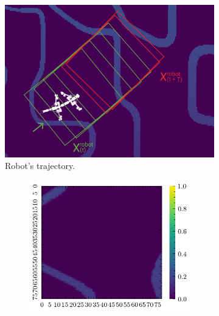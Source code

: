 \documentclass[../document.tex]{subfiles}
\begin{document}
\begin{figure} [htbp]
    \centering
    \begin{subfigure}[b]{0.66\textwidth}
    \includegraphics[width=\textwidth]{../img/krock-bars-correct-small.png}
    \caption{Robot's trajectory.}
\end{subfigure}
\begin{subfigure}[b]{1\textwidth}
    \begin{subfigure}[b]{0.24\textwidth}
    \includegraphics[width=\linewidth]{../img/bars1-example-patches/2d/2.png}    
    \end{subfigure}  
    \begin{subfigure}[b]{0.24\textwidth}

\end{subfigure}
\end{subfigure}
\end{figure}
\end{document}
